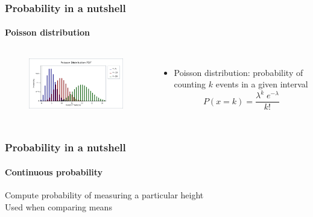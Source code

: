 \documentclass[aspectratio=43]{beamer}
\begin{document}
\begin{frame}
	
	\frametitle{Probability in a nutshell}
	\framesubtitle{Poisson distribution}
	
	\footnotesize
	
	\begin{columns}	
		
		
		\begin{figure}
			\includegraphics[width = 5 cm]{plots/part1/poisson.png}
		\end{figure}
		
		
		\begin{itemize}
			\item Poisson distribution: probability of counting $k$ events in a given interval
			\begin{equation}
				P(x = k) = \frac{\lambda^{k} \; e^{-\lambda}}{k!} \nonumber
			\end{equation}
		\end{itemize}
		
	\end{columns}

\end{frame}

\begin{frame}
	
	\frametitle{Probability in a nutshell}
	\framesubtitle{Continuous probability}

	\footnotesize

	Compute probability of measuring a particular height \\
	Used when comparing means

\end{frame}
\end{document}
